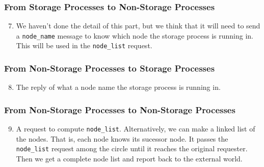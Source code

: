 \documentclass[11pt]{article}
\begin{document}
\subsubsection{From Storage Processes to Non-Storage Processes}
\begin{enumerate}[M1]
\setcounter{enumi}{6}
\item We haven't done the detail of this part, but we think that it will need to send a \texttt{node\_name} message to know which node the storage process is running in. This will be used in the \texttt{node\_list} request.
\end{enumerate}

\subsubsection{From Non-Storage Processes to Storage Processes}
\begin{enumerate}[M1]
\setcounter{enumi}{7}
\item The reply of what a node name the storage process is running in.
\end{enumerate}

\subsubsection{From Non-Storage Processes to Non-Storage Processes}
\begin{enumerate}[M1]
\setcounter{enumi}{8}
\newcommand{\becomeRed}{\texttt{become\_red}}
\item A request to compute \texttt{node\_list}. Alternatively, we can make a linked list of the nodes. That is, each node knows its sucessor node. It passes the \texttt{node\_list} request among the circle until it reaches the original requester. Then we get a complete node list and report back to the external world.
\end{enumerate}
\end{document}
